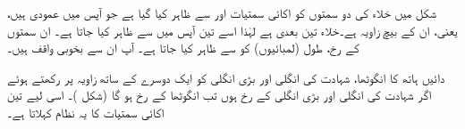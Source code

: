 شکل    میں خلاء کی دو سمتوں کو  اکائی سمتیات  اور  سے ظاہر کیا گیا ہے جو آپس میں عمودی ہیں، یعنی، ان کے بیچ   زاویہ ہے۔خلاء تین بعدی ہے لہٰذا اسے تین آپس میں  سے ظاہر کیا جاتا ہے۔ ان سمتوں کے رخ،  طول (لمبائیوں)  کو  سے ظاہر کیا جاتا ہے۔ آپ ان سے بخوبی واقف ہیں۔ 

 دائیں ہاتھ کا انگوٹھا، شہادت کی انگلی اور  بڑی انگلی کو ایک دوسرے کے ساتھ  زاویہ پر رکھتے ہوئے اگر شہادت کی انگلی  اور بڑی انگلی  کے رخ ہوں تب انگوٹھا  کے رخ ہو گا (شکل )۔ اسی لیے  تین اکائی سمتیات کا یہ نظام   کہلاتا ہے۔

